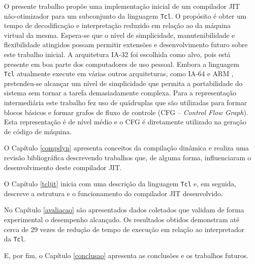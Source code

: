 O presente trabalho propõe uma implementação inicial de um compilador
JIT não-otimizador para um subconjunto da linguagem \texttt{Tcl}. O
propósito é obter um tempo de decodificação e interpretação
reduzido em relação ao da máquina virtual da mesma. Espera-se que o nível de
simplicidade, manutenibilidade e flexibilidade atingidos possam
permitir extensões e desenvolvimento futuro sobre este trabalho inicial.
A arquitetura IA-32 \cite{intel_basicarch} foi escolhida como alvo, pois está presente em boa
parte dos computadores de uso pessoal. Embora a linguagem \texttt{Tcl}
atualmente execute em várias outros arquiteturas, como IA-64
\cite{intel_basicarch} e ARM \cite{arm_arch}, pretendeu-se alcançar um
nível de simplicidade que permita a portabilidade do sistema sem
tornar a tarefa demasiadamente complexa. Para a representação intermediária este trabalho fez uso de
quádruplas \cite{muchnick} que são utilizadas para formar
blocos básicos e
formar grafos de fluxo de controle (CFG -- \textit{Control Flow
  Graph}). Esta representação é de nível médio e
o CFG é diretamente utilizado na geração de código de máquina.

O Capítulo \ref{compdyn} apresenta conceitos da compilação dinâmica e
realiza uma revisão bibliográfica descrevendo trabalhos que, de alguma
forma, influenciaram o desenvolvimento deste compilador JIT.

O Capítulo \ref{tcljit} inicia com uma descrição da linguagem
\texttt{Tcl} e, em seguida, descreve a estrutura e o funcionamento do
compilador JIT desenvolvido.

No Capítulo \ref{avaliacao} são apresentados dados coletados que
validam de forma experimental o desempenho alcançado. Os resultados
obtidos demonstram até cerca de 29 vezes de redução de tempo de
execução em relação ao interpretador da \texttt{Tcl}.

E, por fim, o Capítulo \ref{conclusao} apresenta as conclusões e os
trabalhos futuros.


